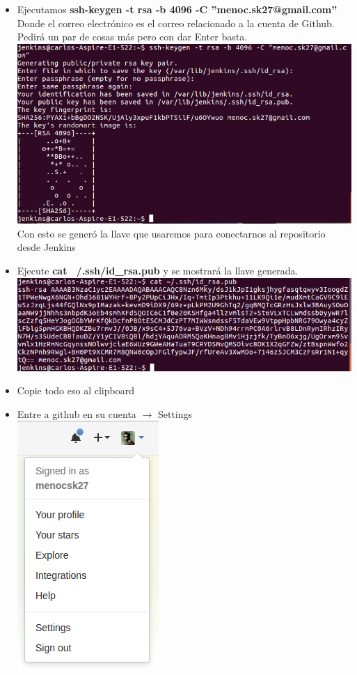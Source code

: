 \documentclass[a4paper]{article}
\begin{document}
{    \begin{itemize}
    \item Ejecutamos \textbf{ssh-keygen -t rsa -b 4096 -C ''menoc.sk27@gmail.com''} Donde el correo electrónico es el correo relacionado a la cuenta de Github. Pedirá un par de cosas más pero con dar Enter basta. \\
        \includegraphics[scale=0.5]{sshkey}\\ 
    Con esto se generó la llave que usaremos para conectarnos al repositorio desde Jenkins
    \item Ejecute \textbf{cat ~/.ssh/id\_rsa.pub} y se mostrará la llave generada. \\
    \includegraphics[scale=0.5]{llave}\\
    \item Copie todo eso al clipboard
    \item Entre a github en su cuenta $\rightarrow$ Settings\\
    \includegraphics[scale=0.5]{gitset}\\

\end{itemize}}
\end{document}

